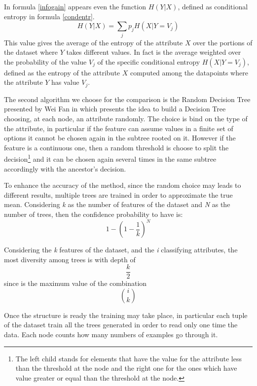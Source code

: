 \documentclass{acm_proc_article-sp-sigmod07}
\begin{document}
In formula \ref{infogain} appears even the function $H(Y|X)$, defined as
conditional entropy in formula \ref{condentr}.
\begin{equation}
H(Y|X) = \sum_{j} p_j H(X| Y  = V_j)
\label{condentr}
\end{equation}
This value gives the average of the entropy of the attribute $X$ over the
portions of the dataset where $Y$ takes different values.
In fact is the average weighted over the probability of the value $V_j$ of
the specific conditional entropy $H(X| Y  = V_j)$, defined as the entropy
of the attribute $X$ computed among the datapoints where the attribute $Y$
has value $V_j$. 

The second algorithm we choose for the comparison is the Random Decision
Tree presented by Wei Fan in \cite{fan:rdt} which presents the idea to
build a Decision Tree choosing, at each node, an attribute randomly. The
choice is bind on the type of the attribute, in particular if the feature
can assume values in a finite set of options it cannot be chosen again in
the subtree rooted on it. However if the feature is a continuous one, then
a random threshold is choose to split the decision\footnote{The left child
stands for elements that have the value for the attribute less than the
threshold at the node and the right one for the ones which have value
greater or equal than the threshold at the node.} and it can be chosen
again several times in the same subtree accordingly with the ancestor's
decision.

To enhance the accuracy of the method, since the random choice may
leads to different results, multiple trees are trained in order to
approximate the true mean. Considering \emph{k} as the number of features
of the dataset and \emph{N} as the number of trees, then the confidence
probability to have is:
\begin{equation}
\label{formula:confidence}
1 - ( 1 - \frac{1}{k})^N
\end{equation}

Considering the \emph{k} features of the dataset, and the \emph{i}
classifying attributes, the most diversity among trees is with depth of 
\begin{equation}
\label{fig:depth}
\frac{k}{2} 
\end{equation}
since is the maximum value of the combination
\begin{equation}
 {{i}\choose{k}}
\end{equation}

Once the structure is ready the training may take place, in
particular each tuple of the dataset train all the trees generated in
order to read only one time the data. Each node counts how many
numbers of examples go through it.
\end{document}
